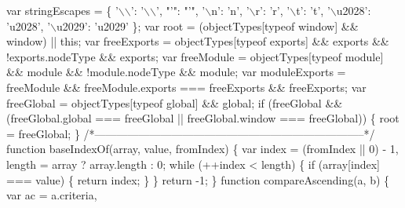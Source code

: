 \begin{DoxyCodeInclude}
\textcolor{stringliteral}{  var stringEscapes = \{}
\textcolor{stringliteral}{    '}\(\backslash\)\(\backslash\)\textcolor{stringliteral}{': '}\(\backslash\)\(\backslash\)\textcolor{stringliteral}{',}
\textcolor{stringliteral}{    "'}\textcolor{stringliteral}{": "}\textcolor{stringliteral}{'",}
\textcolor{stringliteral}{    '}\(\backslash\)n\textcolor{stringliteral}{': '}n\textcolor{stringliteral}{',}
\textcolor{stringliteral}{    '}\(\backslash\)r\textcolor{stringliteral}{': '}r\textcolor{stringliteral}{',}
\textcolor{stringliteral}{    '}\(\backslash\)t\textcolor{stringliteral}{': '}t\textcolor{stringliteral}{',}
\textcolor{stringliteral}{    '}\(\backslash\)u2028\textcolor{stringliteral}{': '}u2028\textcolor{stringliteral}{',}
\textcolor{stringliteral}{    '}\(\backslash\)u2029\textcolor{stringliteral}{': '}u2029\textcolor{stringliteral}{'}
\textcolor{stringliteral}{  \};}
\textcolor{stringliteral}{}
\textcolor{stringliteral}{  var root = (objectTypes[typeof window] && window) || this;}
\textcolor{stringliteral}{}
\textcolor{stringliteral}{  var freeExports = objectTypes[typeof exports] && exports && !exports.nodeType && exports;}
\textcolor{stringliteral}{}
\textcolor{stringliteral}{  var freeModule = objectTypes[typeof module] && module && !module.nodeType && module;}
\textcolor{stringliteral}{}
\textcolor{stringliteral}{  var moduleExports = freeModule && freeModule.exports === freeExports && freeExports;}
\textcolor{stringliteral}{}
\textcolor{stringliteral}{  var freeGlobal = objectTypes[typeof global] && global;}
\textcolor{stringliteral}{  if (freeGlobal && (freeGlobal.global === freeGlobal || freeGlobal.window === freeGlobal)) \{}
\textcolor{stringliteral}{    root = freeGlobal;}
\textcolor{stringliteral}{  \}}
\textcolor{stringliteral}{}
\textcolor{stringliteral}{  /*--------------------------------------------------------------------------*/}
\textcolor{stringliteral}{}
\textcolor{stringliteral}{  function baseIndexOf(array, value, fromIndex) \{}
\textcolor{stringliteral}{    var index = (fromIndex || 0) - 1,}
\textcolor{stringliteral}{        length = array ? array.length : 0;}
\textcolor{stringliteral}{}
\textcolor{stringliteral}{    while (++index < length) \{}
\textcolor{stringliteral}{      if (array[index] === value) \{}
\textcolor{stringliteral}{        return index;}
\textcolor{stringliteral}{      \}}
\textcolor{stringliteral}{    \}}
\textcolor{stringliteral}{    return -1;}
\textcolor{stringliteral}{  \}}
\textcolor{stringliteral}{}
\textcolor{stringliteral}{  function compareAscending(a, b) \{}
\textcolor{stringliteral}{    var ac = a.criteria,}

\end{DoxyCodeInclude}

